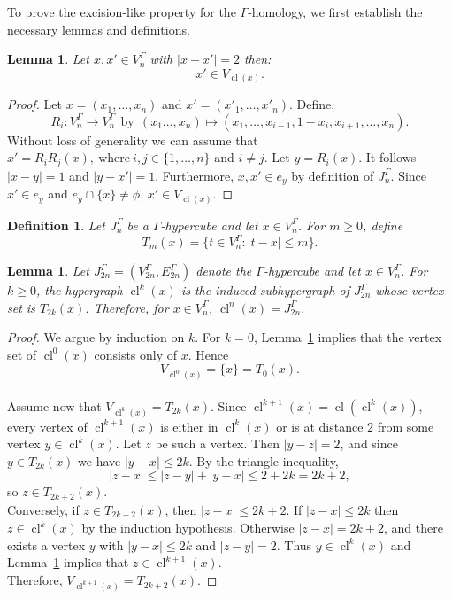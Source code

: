 \documentclass[10pt,a4paper]{amsart}
\newtheorem{Def}[subsection]{Definition}
\newtheorem{lem}[subsection]{Lemma}
\newcommand{\cl}{\operatorname{cl}}
\begin{document}
To prove the excision-like property for the $\Gamma$-homology, we first establish the necessary lemmas and definitions.

\begin{lem}\label{x-x'=2}
    Let $x,x'\in V_n^\Gamma$ with $|x-x'|=2$ then:
        $$x' \in V_{\operatorname{cl}(x)}.$$
\end{lem}

\begin{proof}
Let $x=(x_1,\ldots,x_n)$ and $x'=(x'_1,\ldots,x'_n)$. Define, 
\[R_i:V_n^\Gamma\rightarrow V_n^\Gamma ~~\text{by}~~ (x_1\ldots,x_n)\mapsto (x_1,\ldots,x_{i-1},1-x_i,x_{i+1},\ldots,x_n) .\]
Without loss of generality we can assume that $x'=R_i R_j(x),~ \text{where}~i,j\in \{1,\ldots,n\}$ and $i\ne j$. Let $y=R_i(x)$. It follows $|x-y|=1$ and $|y-x'|=1$. Furthermore, $x,x'\in e_y$ by definition of $J_n^\Gamma.$ Since $x'\in e_y$ and $e_y\cap \{x\}\neq \phi$, $x'\in V_{\cl(x)}.$
\end{proof}


\begin{Def}
Let $J_n^\Gamma$ be a $\Gamma$-hypercube and let $x \in V_n^\Gamma$.
For $m\ge 0$, define
\[
T_m(x)=\{t\in V_n^\Gamma : |t-x|\le m\}.
\]
\end{Def}
%
\begin{lem}\label{closure and T_m}
Let $J_{2n}^\Gamma=(V_{2n}^\Gamma,E_{2n}^\Gamma)$ denote the $\Gamma$-hypercube
and let $x\in V_n^\Gamma$. For $k\ge0$, the hypergraph $\cl^k(x)$ is the induced subhypergraph
of $J_{2n}^\Gamma$ whose vertex set is $T_{2k}(x)$. Therefore, for $x\in V_n^\Gamma$, $\cl^n(x)=J_{2n}^\Gamma.$
\end{lem}
    \begin{proof}
We argue by induction on $k$.
%
For $k=0$, Lemma~\ref{x-x'=2} implies that the vertex set of
$\cl^0(x)$ consists only of $x$. Hence
\[
V_{\cl^0(x)}=\{x\}=T_0(x).
\]
\\
Assume now that $V_{\cl^k(x)}=T_{2k}(x)$.
Since $\cl^{k+1}(x)=\cl(\cl^k(x))$, every vertex of $\cl^{k+1}(x)$
is either in $\cl^k(x)$ or is at distance $2$ from some vertex
$y\in \cl^k(x)$.
Let $z$ be such a vertex. Then $|y-z|=2$, and since
$y\in T_{2k}(x)$ we have $|y-x|\le 2k$.
By the triangle inequality,
\[
|z-x|\le |z-y|+|y-x|\le 2+2k=2k+2,
\]
so $z\in T_{2k+2}(x)$.
\\
Conversely, if $z\in T_{2k+2}(x)$, then $|z-x|\le 2k+2$.
If $|z-x|\le 2k$ then $z\in\cl^k(x)$ by the induction hypothesis.
Otherwise $|z-x|=2k+2$, and there exists a vertex $y$
with $|y-x|\le 2k$ and $|z-y|=2$.
Thus $y\in\cl^k(x)$ and Lemma~\ref{x-x'=2} implies that
$z\in\cl^{k+1}(x)$.
\\
Therefore, $V_{\cl^{k+1}(x)}=T_{2k+2}(x)$.
\end{proof}
\end{document}
